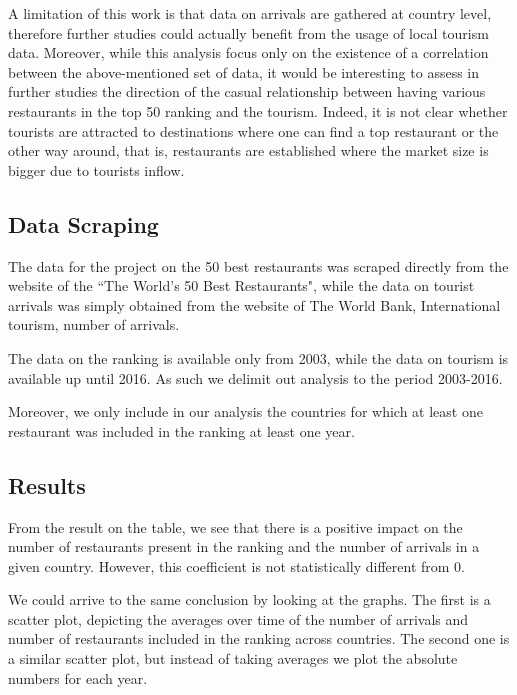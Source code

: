 \documentclass[]{article}
\begin{document}
A limitation of this work is that data on arrivals are gathered at country level, therefore further studies could actually benefit from the usage of local tourism data. Moreover, while this analysis focus only on the existence of a correlation between the above-mentioned set of data, it would be interesting to assess in further studies the direction of the casual relationship between having various restaurants in the top 50 ranking and the tourism. Indeed, it is not clear whether tourists are attracted to destinations where one can find a top restaurant or the other way around, that is, restaurants are established where the market size is bigger due to tourists inflow. 



\subsection{Data Scraping}

The data for the project on the 50 best restaurants was scraped directly from the website of the ``The World's 50 Best Restaurants", while the data on tourist arrivals was simply obtained from the website of The World Bank, International tourism, number of arrivals.

The data on the ranking is available only from 2003, while the data on tourism is available up until 2016. As such we delimit out analysis to the period 2003-2016.

Moreover, we only include in our analysis the countries for which at least one restaurant was included in the ranking at least one year.



\subsection{Results}






From the result on the table, we see that there is a positive impact on the number of restaurants present in the ranking and the number of arrivals in a given country. However, this coefficient is not statistically different from 0.

We could arrive to the same conclusion by looking at the graphs. The first is a scatter plot, depicting the averages over time of the number of arrivals and number of restaurants included in the ranking across countries.
The second one is a similar scatter plot, but instead of taking averages we plot the absolute numbers for each year.
\end{document}
